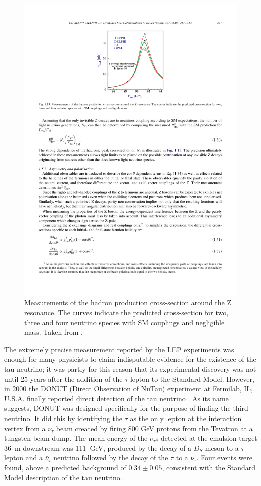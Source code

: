 \begin{figure}
  \centering
  \includegraphics[width=12cm]{LEPZ0Resonance.pdf}
  \caption[Measurements of the hadron production cross-section around the Z resonance.]{Measurements of the hadron production cross-section around the Z resonance.  The curves indicate the predicted cross-section for two, three and four neutrino species with SM couplings and negligible mass.  Taken from \cite{Schael2006}.}
  \label{fig:LEPZ0Resonance}
\end{figure}

The extremely precise measurement reported by the LEP experiments was enough for many physicists to claim indisputable evidence for the existence of the tau neutrino; it was partly for this reason that its experimental discovery was not until 25 years after the addition of the $\tau$ lepton to the Standard Model.  However, in 2000 the DONUT (Direct Observation of NuTau) experiment at Fermilab, IL, U.S.A. finally reported direct detection of the tau neutrino \cite{Kodama2001}.  As its name suggests, DONUT was designed specifically for the purpose of finding the third neutrino.  It did this by identifying the $\tau$ as the only lepton at the interaction vertex from a $\nu_{\tau}$ beam created by firing 800 GeV protons from the Tevatron at a tungsten beam dump.  The mean energy of the $\nu_{\tau}$s detected at the emulsion target 36~m downstream was 111~GeV, produced by the decay of a $D_S$ meson to a $\tau$ lepton and a $\bar{\nu}_{\tau}$ neutrino followed by the decay of the $\tau$ to a $\nu_{\tau}$.  Four events were found, above a predicted background of $0.34\pm0.05$, consistent with the Standard Model description of the tau neutrino.

